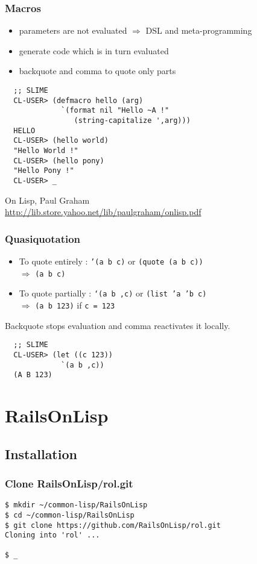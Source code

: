\documentclass[8pt]{beamer}
\begin{document}
\begin{frame}[fragile]
  \frametitle{Macros}
  \begin{itemize}
    \item parameters are not evaluated $\Rightarrow$ DSL and meta-programming
    \item generate code which is in turn evaluated
    \item backquote and comma to quote only parts
  \end{itemize}
\begin{verbatim}
  ;; SLIME
  CL-USER> (defmacro hello (arg)
             `(format nil "Hello ~A !"
                (string-capitalize ',arg)))
  HELLO
  CL-USER> (hello world)
  "Hello World !"
  CL-USER> (hello pony)
  "Hello Pony !"
  CL-USER> _
\end{verbatim}
  \vspace{1em}
  On Lisp, Paul Graham \\
  \url{http://lib.store.yahoo.net/lib/paulgraham/onlisp.pdf}
\end{frame}

\begin{frame}[fragile]
  \frametitle{Quasiquotation}
  \begin{itemize}
  \item To quote entirely : {\tt '(a b c)} or {\tt (quote (a b c))} \\
    $\Rightarrow$ {\tt (a b c)}
  \item To quote partially : {\tt `(a b ,c)} or {\tt (list 'a 'b c)} \\
    $\Rightarrow$ {\tt (a b 123)} if {\tt c = 123}
  \end{itemize}
  Backquote stops evaluation and comma reactivates it locally.
\begin{verbatim}
  ;; SLIME
  CL-USER> (let ((c 123))
             `(a b ,c))
  (A B 123)
\end{verbatim}
\end{frame}

\section{RailsOnLisp}
\subsection{Installation}

\begin{frame}[fragile]
  \frametitle{Clone RailsOnLisp/rol.git}
\begin{verbatim}
$ mkdir ~/common-lisp/RailsOnLisp
$ cd ~/common-lisp/RailsOnLisp
$ git clone https://github.com/RailsOnLisp/rol.git
Cloning into 'rol' ...

$ _
\end{verbatim}
\end{frame}
\end{document}
